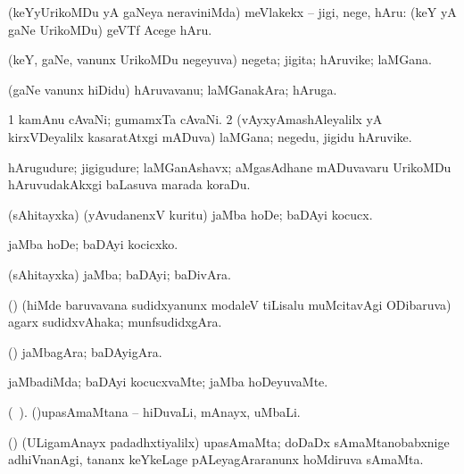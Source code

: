 \noindent 
\gl{\akirx}
\expl{}
\bmng
(keYyUrikoMDu yA gaNeya neraviniMda) meVlakekx -- jigi, nege, hAru:  (keY yA gaNe UrikoMDu) geVTf Acege hAru. 
\emng
\eentry

\bentry
{} 
\gl{\nA}
\expl{}
\bmng
 (keY, gaNe, \mo vanunx UrikoMDu negeyuva) negeta; jigita; hAruvike; laMGana. 
\emng
\eentry

\bentry
{} 
\gl{\nA}
\expl{}
\bmng
 (gaNe \mo vanunx hiDidu) hAruvavanu; laMGanakAra; hAruga. 
\emng
\eentry

\bentry
{} 
\gl{\nA}
\expl{}
\bmng
\bnum
\num{1} kamAnu cAvaNi; gumamxTa cAvaNi. 
\num{2} (vAyxyAmashAleyalilx yA kirxVDeyalilx kasaratAtxgi mADuva) laMGana; negedu, jigidu hAruvike. 
\enum
\emng
\eentry

\bentry
{} 
\gl{\nA}
\expl{}
\bmng
 hArugudure; jigigudure; laMGanAshavx; aMgasAdhane mADuvavaru UrikoMDu hAruvudakAkxgi baLasuva marada koraDu. 
\emng
\eentry

\bentry
{} 
\gl{\sakirx}
\expl{}
\bmng
 (sAhitayxka) (yAvudanenxV kuritu) jaMba hoDe; baDAyi kocucx. 
\emng

\noindent 
\gl{\akirx}
\expl{}
\bmng
 jaMba hoDe; baDAyi kocicxko. 
\emng
\eentry

\bentry
{} 
\gl{\nA}
\expl{}
\bmng
 (sAhitayxka) jaMba; baDAyi; baDivAra. 
\emng
\eentry

\bentry
{} 
\gl{\nA}
\expl{}
\bmng
(\pArxparx) (hiMde baruvavana sudidxyanunx modaleV tiLisalu muMcitavAgi ODibaruva) agarx sudidxvAhaka; munfsudidxgAra. 
\emng
\eentry

\bentry
{} 
\gl{\nA}
\expl{}
\bmng
(\pArxparx) jaMbagAra; baDAyigAra. 
\emng
\eentry

\bentry
{} 
\gl{\kirxvi}
\expl{}
\bmng
 jaMbadiMda; baDAyi kocucxvaMte; jaMba hoDeyuvaMte. 
\emng
\eentry

\bentry
{} 
\gl{\nA}(\bava\ ). 
\bmng
 (\ca)upasAmaMtana -- hiDuvaLi, mAnayx, uMbaLi. 
\emng
\eentry

\bentry
{} 
\gl{\nA}
\expl{}
(\ca) \bmng
 (ULigamAnayx padadhxtiyalilx) upasAmaMta; doDaDx sAmaMtanobabxnige adhiVnanAgi, tananx keYkeLage pALeyagAraranunx hoMdiruva sAmaMta. 
\emng
\eentry

